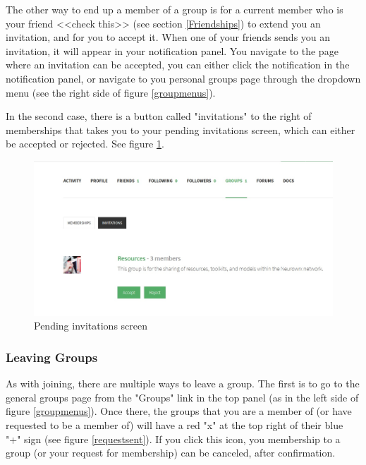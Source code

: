 \documentclass[10pt]{article}
\begin{document}
\begin{flushleft}
The other way to end up a member of a group is for a current member who is your friend <<check this>> (see section \ref{Friendships}) to extend you an invitation, and for you to accept it.  When one of your friends sends you an invitation, it will appear in your notification panel.  You navigate to the page where an invitation can be accepted, you can either click the notification in the notification panel, or navigate to you personal groups page through the dropdown menu (see the right side of figure \ref{groupmenus}). 
\end{flushleft}

\begin{flushleft}
 In the second case, there is a button called "invitations" to the right of memberships that takes you to your pending invitations screen, which can either be accepted or rejected.  See figure \ref{invites}. 
\end{flushleft}

\begin{figure}[h]
    \centering
    \includegraphics[scale=0.3]{images/invitations.jpg}
    \caption{Pending invitations screen}
    \label{invites}
\end{figure}

\subsubsection{Leaving Groups}

\begin{flushleft}
As with joining, there are multiple ways to leave a group.  The first is to go to the general groups page from the "Groups" link in the top panel (as in the left side of figure \ref{groupmenus}).  Once there, the groups that you are a member of (or have requested to be a member of) will have a red "x" at the top right of their blue "+" sign (see figure \ref{requestsent}).  If you click this icon, you membership to a group (or your request for membership) can be canceled, after confirmation. 
\end{flushleft}
\end{document}
